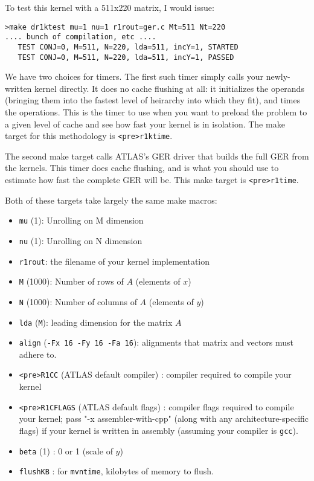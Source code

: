 \documentclass[11pt]{article}
\begin{document}
To test this kernel with a 511x220 matrix, I would issue:
\begin{verbatim}
>make dr1ktest mu=1 nu=1 r1rout=ger.c Mt=511 Nt=220
.... bunch of compilation, etc ....
   TEST CONJ=0, M=511, N=220, lda=511, incY=1, STARTED
   TEST CONJ=0, M=511, N=220, lda=511, incY=1, PASSED
\end{verbatim}

We have two choices for timers.
The first such timer simply calls your newly-written kernel directly.
It does no cache flushing at all: it initializes the operands
(bringing them into the fastest level of heirarchy into which they fit),
and times the operations.  This is the timer to use when you want to preload
the problem to a given level of cache and see how fast your kernel is in
isolation.  The make target for this methodology is \verb+<pre>r1ktime+.

The second make target calls ATLAS's GER driver that builds the full
GER from the kernels.  This timer does cache flushing, and is what you
should use to estimate how fast the complete GER will be.  This make target
is \verb+<pre>r1time+.

Both of these targets take largely the same make macros:
\begin{itemize}
\item \verb+mu+ (1): Unrolling on M dimension
\item \verb+nu+ (1): Unrolling on N dimension
\item \verb+r1rout+: the filename of your kernel implementation
\item \verb+M+ (1000): Number of rows of $A$ (elements of $x$)
\item \verb+N+ (1000): Number of columns of $A$ (elements of $y$)
\item \verb+lda+ (\verb+M+): leading dimension for the matrix $A$
\item \verb+align+ (\verb+-Fx 16 -Fy 16 -Fa 16+): alignments that
      matrix and vectors must adhere to.
\item \verb+<pre>R1CC+ (ATLAS default compiler) : compiler required
      to compile your kernel
\item \verb+<pre>R1CFLAGS+ (ATLAS default flags) : compiler flags required
      to compile your kernel; pass "-x assembler-with-cpp" (along with any
      architecture-specific flags) if your kernel is written in assembly
      (assuming your compiler is \texttt{gcc}).
\item \verb+beta+ (1) : 0 or 1 (scale of $y$)
\item \verb+flushKB+ : for {\tt mvntime}, kilobytes of memory to flush.
\end{itemize}
\end{document}
